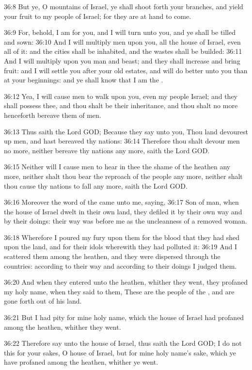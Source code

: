 36:8 But ye, O mountains of Israel, ye shall shoot forth your
branches, and yield your fruit to my people of Israel; for they are at
hand to come.

36:9 For, behold, I am for you, and I will turn unto you, and ye shall
be tilled and sown: 36:10 And I will multiply men upon you, all the
house of Israel, even all of it: and the cities shall be inhabited,
and the wastes shall be builded: 36:11 And I will multiply upon you
man and beast; and they shall increase and bring fruit: and I will
settle you after your old estates, and will do better unto you than at
your beginnings: and ye shall know that I am the \LORD.

36:12 Yea, I will cause men to walk upon you, even my people Israel;
and they shall possess thee, and thou shalt be their inheritance, and
thou shalt no more henceforth bereave them of men.

36:13 Thus saith the Lord GOD; Because they say unto you, Thou land
devourest up men, and hast bereaved thy nations: 36:14 Therefore thou
shalt devour men no more, neither bereave thy nations any more, saith
the Lord GOD.

36:15 Neither will I cause men to hear in thee the shame of the
heathen any more, neither shalt thou bear the reproach of the people
any more, neither shalt thou cause thy nations to fall any more, saith
the Lord GOD.

36:16 Moreover the word of the \LORD came unto me, saying, 36:17 Son of
man, when the house of Israel dwelt in their own land, they defiled it
by their own way and by their doings: their way was before me as the
uncleanness of a removed woman.

36:18 Wherefore I poured my fury upon them for the blood that they had
shed upon the land, and for their idols wherewith they had polluted
it: 36:19 And I scattered them among the heathen, and they were
dispersed through the countries: according to their way and according
to their doings I judged them.

36:20 And when they entered unto the heathen, whither they went, they
profaned my holy name, when they said to them, These are the people of
the \LORD, and are gone forth out of his land.

36:21 But I had pity for mine holy name, which the house of Israel had
profaned among the heathen, whither they went.

36:22 Therefore say unto the house of Israel, thus saith the Lord GOD;
I do not this for your sakes, O house of Israel, but for mine holy
name's sake, which ye have profaned among the heathen, whither ye
went.

